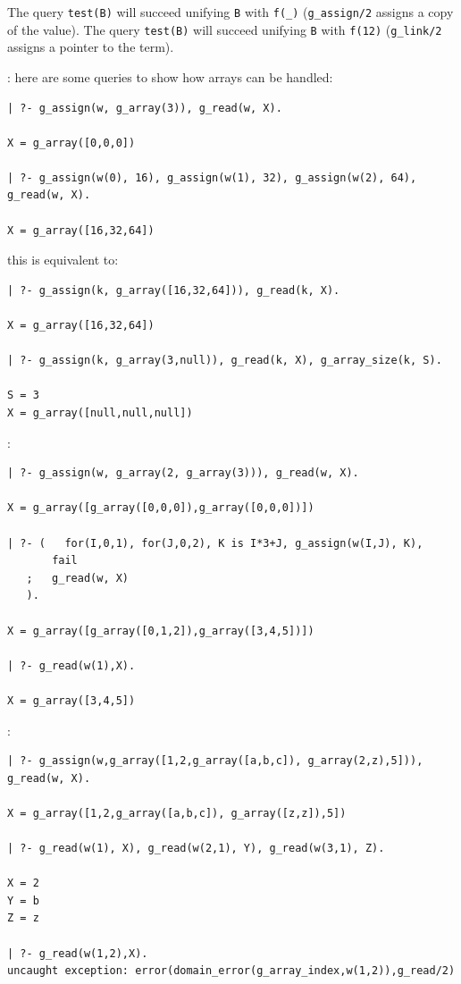 The query \texttt{test(B)} will succeed unifying \texttt{B} with
\texttt{f(\_)} (\texttt{g\_assign/2} assigns a copy of the value). The query
\texttt{test(B)} will succeed unifying \texttt{B} with \texttt{f(12)}
(\texttt{g\_link/2} assigns a pointer to the term).

: here are some queries to show how arrays
can be handled:

\begin{Code}
\begin{verbatim}
| ?- g_assign(w, g_array(3)), g_read(w, X).

X = g_array([0,0,0])

| ?- g_assign(w(0), 16), g_assign(w(1), 32), g_assign(w(2), 64), g_read(w, X).

X = g_array([16,32,64])
\end{verbatim}
\end{Code}

this is equivalent to:

\begin{Code}
\begin{verbatim}
| ?- g_assign(k, g_array([16,32,64])), g_read(k, X).

X = g_array([16,32,64])

| ?- g_assign(k, g_array(3,null)), g_read(k, X), g_array_size(k, S).

S = 3
X = g_array([null,null,null])
\end{verbatim}
\end{Code}

:

\begin{Code}
\begin{verbatim}
| ?- g_assign(w, g_array(2, g_array(3))), g_read(w, X).

X = g_array([g_array([0,0,0]),g_array([0,0,0])])

| ?- (   for(I,0,1), for(J,0,2), K is I*3+J, g_assign(w(I,J), K),
       fail
   ;   g_read(w, X)
   ).

X = g_array([g_array([0,1,2]),g_array([3,4,5])])

| ?- g_read(w(1),X).

X = g_array([3,4,5])
\end{verbatim}
\end{Code}

:

\begin{Code}
\begin{verbatim}
| ?- g_assign(w,g_array([1,2,g_array([a,b,c]), g_array(2,z),5])), g_read(w, X).

X = g_array([1,2,g_array([a,b,c]), g_array([z,z]),5])

| ?- g_read(w(1), X), g_read(w(2,1), Y), g_read(w(3,1), Z).

X = 2
Y = b
Z = z

| ?- g_read(w(1,2),X).
uncaught exception: error(domain_error(g_array_index,w(1,2)),g_read/2)
\end{verbatim}
\end{Code}

